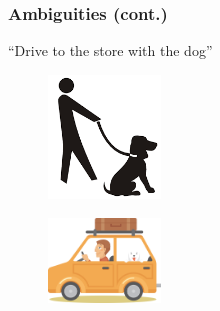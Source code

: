 \documentclass{beamer}
\begin{document}
\begin{frame}

\frametitle{Ambiguities (cont.)}

\begin{alertblock}{}
``Drive to the store with the dog''
\end{alertblock}
\pause
\begin{figure}
\hspace*{-3mm}%
\centering
   \includegraphics[width=3cm]{pics/personDog.png}
\end{figure}
\pause
\begin{figure}
\hspace*{-3mm}%
\centering
   \includegraphics[width=3cm]{pics/dogCar.png}
 \end{figure}
  
\end{frame}







\end{document}
